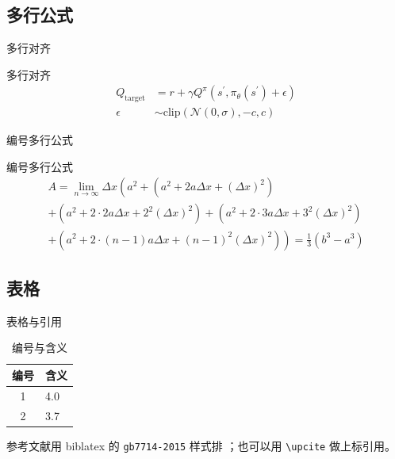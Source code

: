 \documentclass[aspectratio=169]{ctexbeamer} %
\begin{document}
\subsection{多行公式}

\begin{frame}{多行对齐}
  \begin{exampleblock}{多行对齐}
    \begin{align}
      Q_\mathrm{target} &= r+\gamma Q^\pi(s^\prime, \pi_\theta(s^\prime)+\epsilon)\\
      \epsilon &\sim\mathrm{clip}(\mathcal{N}(0, \sigma), -c, c)\nonumber
    \end{align}
  \end{exampleblock}
\end{frame}

\begin{frame}{编号多行公式}
  \begin{exampleblock}{编号多行公式}
    \small
    \begin{multline}
      A=\lim_{n\rightarrow\infty}\Delta x\left(a^{2}+\left(a^{2}+2a\Delta x+\left(\Delta x\right)^{2}\right)\right.\\
      +\left(a^{2}+2\cdot2a\Delta x+2^{2}\left(\Delta x\right)^{2}\right)
      +\left(a^{2}+2\cdot3a\Delta x+3^{2}\left(\Delta x\right)^{2}\right)\\
      \left.+\left(a^{2}+2\cdot(n-1)a\Delta x+(n-1)^{2}\left(\Delta x\right)^{2}\right)\right)
      =\frac{1}{3}\left(b^{3}-a^{3}\right)
    \end{multline}
  \end{exampleblock}
\end{frame}

\subsection{表格}

\begin{frame}{表格与引用}
  \begin{table}[h]
    \centering
    \caption{编号与含义}
    \begin{tabular}{cl}
      \toprule
      编号 & 含义 \\
      \midrule
      1 & 4.0 \\
      2 & 3.7 \\
      \bottomrule
    \end{tabular}
  \end{table}
  参考文献用 biblatex 的 \texttt{gb7714-2015} 样式排
  \parencite{beamer2026}；也可以用 \texttt{\textbackslash upcite}
  做上标引用。
\end{frame}
\end{document}
